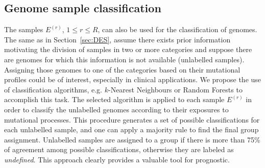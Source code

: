 \documentclass{bioinfo}
\begin{document}
\subsection{Genome sample classification}\label{sec:Class} 
The samples $E^{(r)}$, $1\leq r\leq R$, can also be used for the
classification of genomes. The same as in Section~\ref{sec:DES},
assume there exists prior information motivating the
division of samples in two or more categories and suppose there are
genomes for which this information is not available 
(unlabelled samples). Assigning those genomes to one of the categories 
based on their mutational profiles could be of interest, especially
in clinical applications. We propose the use of classification
algorithms, e.g. $k$-Nearest Neighbours or Random Forests to
accomplish this task. The selected algorithm is applied to each 
sample $E^{(r)}$ in order to classify the unlabelled
genomes according to their exposures to mutational processes.
This procedure generates a set of possible classifications
for each unlabelled sample, and one can apply a majority rule to find
the final group assignment.  Unlabelled samples are assigned to a
group if there is more than 75\% of agreement among possible
classifications, otherwise they are labeled as \textit{undefined}.
This approach clearly provides a valuable tool for prognostic.
\end{document}
